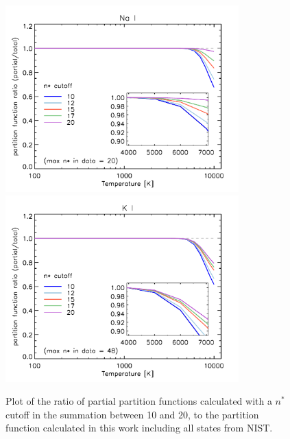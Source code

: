 \documentclass[traditabstract]{aa} %
\begin{document}
  \begin{figure}[ht]
   \centering
   \includegraphics[width=90mm,angle=0]{figures/Na_I_partf_nstar_cutoff.pdf}
   \includegraphics[width=90mm,angle=0]{figures/K_I_partf_nstar_cutoff.pdf}
      \caption{Plot of the ratio of partial partition functions calculated with a $n^*$ cutoff in the summation between 10 and 20, to the partition function calculated in this work including all states from NIST.}
         \label{fig:cutoff}
   \end{figure}
\end{document}
